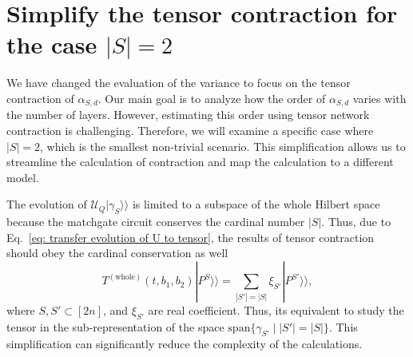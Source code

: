 \documentclass{article}
\newcommand{\Twhole}{T^{(\text{whole})}}
\newcommand{\supket}[1]{|#1 \rangle\rangle}
\begin{document}
\section{Simplify the tensor contraction for the case $|S|=2$}
We have changed the evaluation of the variance to focus on the tensor contraction of $\alpha_{S,d}$. Our main goal is to analyze how the order of $\alpha_{S,d}$ varies with the number of layers. However, estimating this order using tensor network contraction is challenging. Therefore, we will examine a specific case where $|S|=2$, which is the smallest non-trivial scenario. This simplification allows us to streamline the calculation of contraction and map the calculation to a different model.



The evolution of $\mathcal{U}_Q \supket{\gamma_S}$ is limited to a subspace of the whole Hilbert space because the matchgate circuit conserves the cardinal number $|S|$. Thus, due to Eq.~\eqref{eq: transfer evolution of U to tensor}, the results of tensor contraction should obey the cardinal conservation as well
\begin{equation}
    \label{eq: zz anonymous 1}
    \Twhole (t, b_1,b_2)\supket{P^S}  = \sum_{|S'| = |S|} \xi_{S'} \supket{P^{S'}},
\end{equation}
where $S, S' \subset [2n]$, and $\xi_{S'}$ are real coefficient. 
Thus, its equivalent to study the tensor in the sub-representation of the space $\mathrm{span}\{\gamma_{S'} \mid |S'| = |S| \}$. This simplification can significantly reduce the complexity of the calculations.


\end{document}
